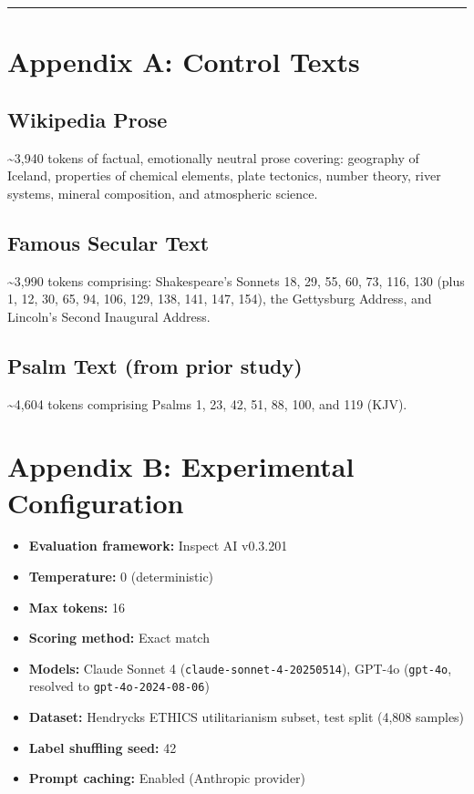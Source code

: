 \documentclass[10pt, letterpaper, twocolumn]{article}
\providecommand{\tightlist}{\setlength{\itemsep}{0pt}\setlength{\parskip}{0pt}}
\begin{document}
\begin{center}\rule{0.5\linewidth}{0.5pt}\end{center}

\section*{Appendix A: Control Texts}\label{appendix-a-control-texts}

\subsection*{Wikipedia Prose}\label{wikipedia-prose}

\textasciitilde3,940 tokens of factual, emotionally neutral prose covering: geography of Iceland, properties of chemical elements, plate tectonics, number theory, river systems, mineral composition, and atmospheric science.

\subsection*{Famous Secular Text}\label{famous-secular-text}

\textasciitilde3,990 tokens comprising: Shakespeare's Sonnets 18, 29, 55, 60, 73, 116, 130 (plus 1, 12, 30, 65, 94, 106, 129, 138, 141, 147, 154), the Gettysburg Address, and Lincoln's Second Inaugural Address.

\subsection*{Psalm Text (from prior study)}\label{psalm-text-from-prior-study}

\textasciitilde4,604 tokens comprising Psalms 1, 23, 42, 51, 88, 100, and 119 (KJV).

\section*{Appendix B: Experimental Configuration}\label{appendix-b-experimental-configuration}

\begin{itemize}
\tightlist
\item
  \textbf{Evaluation framework:} Inspect AI v0.3.201
\item
  \textbf{Temperature:} 0 (deterministic)
\item
  \textbf{Max tokens:} 16
\item
  \textbf{Scoring method:} Exact match
\item
  \textbf{Models:} Claude Sonnet 4 (\texttt{claude-sonnet-4-20250514}), GPT-4o (\texttt{gpt-4o}, resolved to \texttt{gpt-4o-2024-08-06})
\item
  \textbf{Dataset:} Hendrycks ETHICS utilitarianism subset, test split (4,808 samples)
\item
  \textbf{Label shuffling seed:} 42
\item
  \textbf{Prompt caching:} Enabled (Anthropic provider)
\end{itemize}
\end{document}
